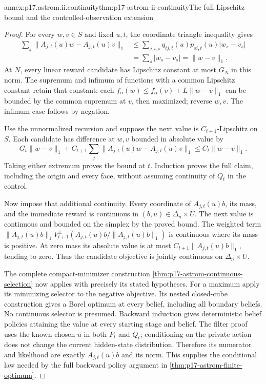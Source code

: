 \begin{annexitem}{annex:p17.astrom.ii.continuity}{thm:p17-astrom-ii-continuity}{The full Lipschitz bound and the controlled-observation extension}
\begin{proof}
For every \(w,v\in S\) and fixed \(u,t\),
the coordinate triangle inequality gives
\[
 \begin{split}
 \sum_j\|A_{j,t}(u)w-A_{j,t}(u)v\|_1
 &\leq\sum_{j,i,s}q_{ij,t}(u)p_{si,t}(u)|w_s-v_s|\\
 &=\sum_s|w_s-v_s|=\|w-v\|_1 .
 \end{split}
\]
At \(N\), every linear reward candidate has
Lipschitz constant at most \(G_N\) in this norm.
The supremum and infimum of functions with a
common Lipschitz constant retain that constant:
each \(f_\alpha(w)\leq f_\alpha(v)+L\|w-v\|_1\)
can be bounded by the common supremum at \(v\),
then maximized; reverse \(w,v\).
The infimum case follows by negation.

Use the unnormalized recursion and suppose the
next value is \(C_{t+1}\)-Lipschitz on \(S\).
Each candidate has difference at \(w,v\) bounded
in absolute value by
\[
 G_t\|w-v\|_1+
 C_{t+1}\sum_j\|A_{j,t}(u)w-A_{j,t}(u)v\|_1
                      \leq C_t\|w-v\|_1.
\]
Taking either extremum proves the bound at \(t\).
Induction proves the full claim, including
the origin and every face, without assuming
continuity of \(Q_t\) in the control.

Now impose that additional continuity.
Every coordinate of \(A_{j,t}(u)b\), its mass,
and the immediate reward is continuous in
\((b,u)\in\Delta_n\times U\).
The next value is continuous and bounded on
the simplex by the proved bound.
The weighted term
\(\|A_{j,t}(u)b\|_1
 V_{t+1}^\pm(A_{j,t}(u)b/\|A_{j,t}(u)b\|_1)\)
is continuous where its mass is positive.
At zero mass its absolute value is at most
\(C_{t+1}\|A_{j,t}(u)b\|_1\), tending to zero.
Thus the candidate objective is jointly continuous
on \(\Delta_n\times U\).

The complete compact-minimizer construction
\cref{thm:p17-astrom-continuous-selection} now
applies with precisely its stated hypotheses.
For a maximum apply its minimizing selector to
the negative objective.
Its nested closed-cube construction gives a
Borel optimum at every belief, including all
boundary beliefs. No continuous selector is
presumed. Backward induction gives deterministic
belief policies attaining the value at every
starting stage and belief.
The filter proof uses the known chosen \(u\)
in both \(P_t\) and \(Q_t\); conditioning on
the private action does not change the
current hidden-state distribution.
Therefore its numerator and likelihood are
exactly \(A_{j,t}(u)b\) and its norm.
This supplies the conditional law needed by
the full backward policy argument in
\cref{thm:p17-astrom-finite-optimum}.


\end{proof}
\end{annexitem}
